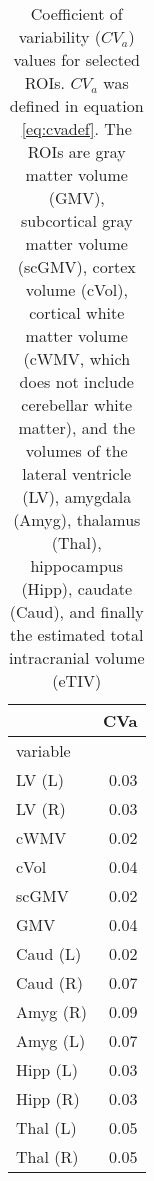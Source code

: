 \begin{table}
[]
\centering

\begin{tabular}{lr}
\toprule
{} &   CVa \\
\midrule
variable                &       \\
LV (L)  &  0.03 \\
LV (R) &  0.03 \\
cWMV  &  0.02 \\
cVol               &  0.04 \\
scGMV         &  0.02 \\
GMV           &  0.04 \\
Caud (L)           &  0.02 \\
Caud (R)          &  0.07 \\
Amyg (R)          &  0.09 \\
Amyg (L)           &  0.07 \\
Hipp (L)        &  0.03 \\
Hipp (R)      &  0.03 \\
Thal (L)    &  0.05 \\
Thal (R)   &  0.05 \\
\bottomrule
\end{tabular}
\caption{Coefficient of variability ($CV_{a}$) values for selected ROIs. $CV_{a}$ was defined in equation \ref{eq:cvadef}. The ROIs are gray matter volume (GMV), subcortical gray matter volume (scGMV), cortex volume (cVol), cortical white matter volume (cWMV, which does not include cerebellar white matter), and the volumes of the lateral ventricle (LV), amygdala (Amyg), thalamus (Thal), hippocampus (Hipp), caudate (Caud), and finally the estimated total intracranial volume (eTIV)}
\label{tab:cva} 
\end{table}